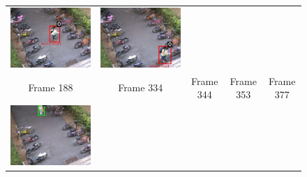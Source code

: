 \begin{frame}
\begin{figure}[t]
\begin{tabular}{ccccc}
            \includegraphics[scale=0.17]{figures/case-2-suspicious-0353} &
            \includegraphics[scale=0.17]{figures/case-2-suspicious-0377} \\
            \small Frame 188 & 
            \small Frame 334 & 
            \small Frame 344 & 
            \small Frame 353 & 
            \small Frame 377 \\
            \includegraphics[scale=0.17]{figures/case-3-suspicious-0173} &

\end{tabular}
\end{figure}
\end{frame}
